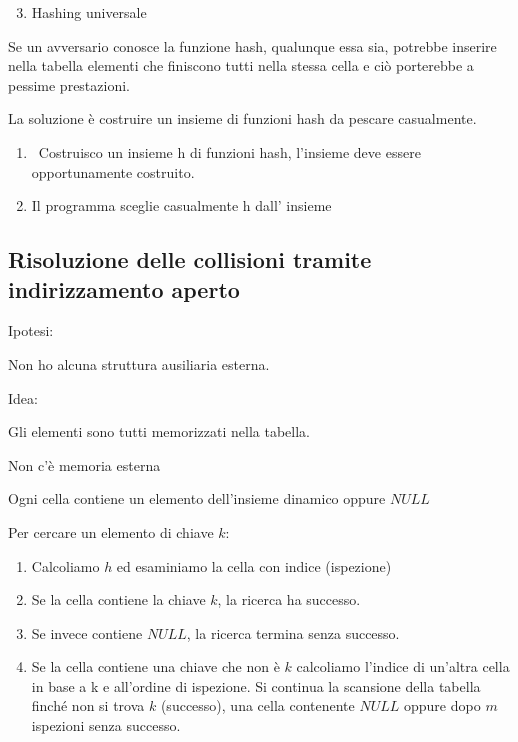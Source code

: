 \documentclass{article}
\providecommand{\tightlist}{%
  \setlength{\itemsep}{0pt}\setlength{\parskip}{0pt}}
\begin{document}
{\begin{enumerate}
\setcounter{enumi}{2}
\tightlist
\item
  {Hashing universale}
\end{enumerate}

{}

{Se un avversario conosce la funzione hash, qualunque essa sia, potrebbe inserire nella tabella elementi che finiscono tutti nella stessa cella e ciò porterebbe a pessime prestazioni.}

{}

{La soluzione è costruire un insieme di funzioni hash da pescare casualmente.}

{}

\begin{enumerate}
\tightlist
\item
  {~Costruisco un insieme h di funzioni hash, l'insieme deve essere
  opportunamente costruito.}
\item
  {Il programma sceglie casualmente h dall' insieme}
\end{enumerate}

\hypertarget{h.3fhh68cy94hw}{\subsection{\texorpdfstring{{Risoluzione delle collisioni tramite indirizzamento aperto}}{Risoluzione delle collisioni tramite indirizzamento aperto}}\label{h.3fhh68cy94hw}}

{Ipotesi: }

{Non ho alcuna struttura ausiliaria esterna.}

{}

{Idea:}

{Gli elementi sono tutti memorizzati nella tabella.}

{Non c'è memoria esterna}

{}

{Ogni cella contiene un elemento dell'insieme dinamico oppure $NULL$}

{}

{Per cercare un elemento di chiave $k$:}

\begin{enumerate}
\tightlist
\item
  {Calcoliamo $h$ ed esaminiamo la cella con indice (ispezione)}
\item
  {Se la cella contiene la chiave $k$, la ricerca ha successo. }
\item
  {Se invece contiene $NULL$, la ricerca termina senza successo.}
\item
  {Se la cella contiene una chiave che non è $k$ calcoliamo l'indice di un'altra cella in base a k e all'ordine di ispezione. Si continua la scansione della tabella finché non si trova $k$ (successo), una cella contenente $NULL$ oppure dopo $m$ ispezioni senza successo.}
\end{enumerate}

}
\end{document}
